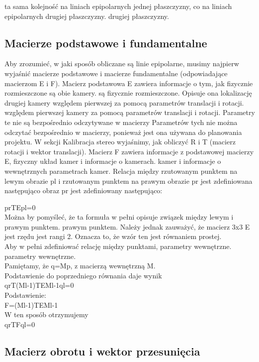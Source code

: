 \documentclass[magisterska]{pracadypl}
\begin{document}
ta sama kolejność na liniach epipolarnych jednej płaszczyzny, co na liniach epipolarnych drugiej płaszczyzny.
drugiej płaszczyzny.

\subsection{Macierze podstawowe i fundamentalne}

Aby zrozumieć, w jaki sposób obliczane są linie epipolarne, musimy najpierw wyjaśnić macierze podstawowe
i macierze fundamentalne (odpowiadające macierzom E i F).
Macierz podstawowa E zawiera informacje o tym, jak fizycznie rozmieszczone są obie kamery.
są fizycznie rozmieszczone. Opisuje ona lokalizację drugiej kamery względem pierwszej za pomocą parametrów translacji i rotacji.
względem pierwszej kamery za pomocą parametrów translacji i rotacji. Parametry te nie są bezpośrednio odczytywane w macierzy
Parametrów tych nie można odczytać bezpośrednio w macierzy, ponieważ jest ona używana do planowania projektu. W sekcji Kalibracja stereo
wyjaśnimy, jak obliczyć R i T (macierz rotacji i wektor translacji).
Macierz F zawiera informacje z podstawowej macierzy E, fizyczny układ kamer i informacje o kamerach.
kamer i informacje o wewnętrznych parametrach kamer.
Relacja między rzutowanym punktem na lewym obrazie pl i rzutowanym punktem na prawym obrazie pr jest zdefiniowana następująco
obraz pr jest zdefiniowany następująco:

prTEpl=0\\
Można by pomyśleć, że ta formuła w pełni opisuje związek między lewym i prawym punktem.
prawym punktem. Należy jednak zauważyć, że macierz 3x3 E jest rzędu
jest rangi 2. Oznacza to, że wzór ten jest równaniem prostej.\\
Aby w pełni zdefiniować relację między punktami, parametry wewnętrzne.
parametry wewnętrzne.\\
Pamiętamy, że q=Mp, z macierzą wewnętrzną M.\\
Podstawienie do poprzedniego równania daje wynik\\
qrT(Ml-1)TEMl-1ql=0\\
Podstawienie:\\
F=(Ml-1)TEMl-1\\
W ten sposób otrzymujemy\\
qrTFql=0\\

\subsection{Macierz obrotu i wektor przesunięcia}
\end{document}
